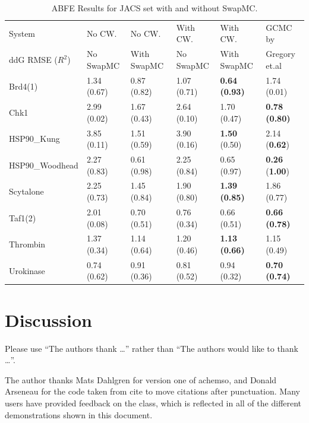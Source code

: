 \documentclass[journal=jacsat,manuscript=article]{achemso}
\begin{document}
\begin{table}
  \caption{ABFE Results for JACS set with and without SwapMC.}
  \label{tbl:abfe_jacs}
  \begin{tabular}{l|lllll}
    \hline
    System                    & No CW.     & No CW.        & With CW.    & With CW.     & GCMC by  \\
    ddG RMSE ($R^2$)          & No SwapMC  & With SwapMC   & No SwapMC   & With SwapMC  & Gregory et.al~\cite{ross2020enhancing} \\
    \hline
    Brd4(1)                      & 1.34 (0.67) & 0.87 (0.82) & 1.07 (0.71) & \textbf{0.64 (0.93)} & 1.74 (0.01) \\
    Chk1                         & 2.99 (0.02) & 1.67 (0.43) & 2.64 (0.10) & 1.70 (0.47) & \textbf{0.78 (0.80)} \\
    HSP90\_Kung                  & 3.85 (0.11) & 1.51 (0.59) & 3.90 (0.16) & \textbf{1.50} (0.50) & 2.14 (\textbf{0.62}) \\
    HSP90\_Woodhead              & 2.27 (0.83) & 0.61 (0.98) & 2.25 (0.84) & 0.65 (0.97) & \textbf{0.26} (\textbf{1.00}) \\
    Scytalone                    & 2.25 (0.73) & 1.45 (0.84) & 1.90 (0.80) & \textbf{1.39 (0.85)} & 1.86 (0.77) \\
    Taf1(2)                      & 2.01 (0.08) & 0.70 (0.51) & 0.76 (0.34) & 0.66 (0.51) & \textbf{0.66 (0.78)} \\
    Thrombin                     & 1.37 (0.34) & 1.14 (0.64) & 1.20 (0.46) & \textbf{1.13 (0.66)} & 1.15 (0.49) \\
    Urokinase                    & 0.74 (0.62) & 0.91 (0.36) & 0.81 (0.52) & 0.94 (0.32) & \textbf{0.70 (0.74)} \\
    \hline
  \end{tabular}
\end{table}


\section{Discussion}





\begin{acknowledgement}

Please use ``The authors thank \ldots'' rather than ``The
authors would like to thank \ldots''.

The author thanks Mats Dahlgren for version one of \textsf{achemso},
and Donald Arseneau for the code taken from \textsf{cite} to move
citations after punctuation. Many users have provided feedback on the
class, which is reflected in all of the different demonstrations
shown in this document.

\end{acknowledgement}
\end{document}
